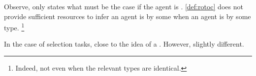 \begin{note}
  Observe, \rotoc{} only states what must be the case if the agent is \tCV{}.
  \autoref{def:rotoc} does not provide sufficient resources to infer an agent is \tCV{} by some \torN{} when an agent is \ptCV{} by some type.%
  \footnote{
    Indeed, not even when the relevant types are identical.
  }
\end{note}






\begin{note}
  In the case of selection tasks, close to the idea of a \tRep{}.
  However, slightly different.
\end{note}

